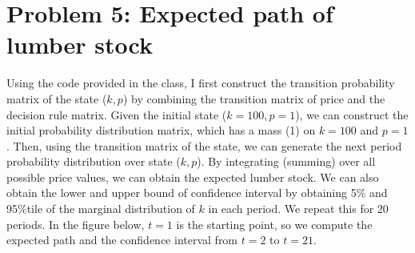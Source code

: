 \documentclass[11pt,letter]{article}
\newcounter{lem}[section] \setcounter{lem}{0}
\newcommand{\Exp}[1]{\mathbb{E}\left[{#1}\right]}
\newcommand{\abs}[1]{\left\lvert{#1}\right\rvert}
\newcommand{\code}[1]{\texttt{#1}}
\begin{document}
\newpage
\section*{Problem 5: Expected path of lumber stock}


Using the code provided in the class, I first construct the transition probability matrix of the state ($k,p$) by combining the transition matrix of price and the decision rule matrix. Given the initial state ($k=100,p=1$), we can construct the initial probability distribution matrix, which has a mass (1) on $k=100$ and $p=1$. Then, using the transition matrix of the state, we can generate the next period probability distribution over state ($k,p$). By integrating (summing) over all possible price values, we can obtain the expected lumber stock. We can also obtain the lower and upper bound of confidence interval by obtaining 5\% and 95\%tile of the marginal distribution of $k$ in each period. We repeat this for 20 periods. In the figure below, $t=1$ is the starting point, so we compute the expected path and the confidence interval from $t=2$ to $t=21$.

%
%
%
\end{document}
